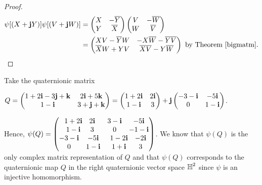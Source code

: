 \begin{proof}
		\begin{align*}
		\psi[(X+\textbf{j} Y)]\psi[(V+\textbf{j} W)] &= 
		\begin{pmatrix}
		X & -\overline{Y} \\ 
		Y & \overline{X} 
		\end{pmatrix}
		\begin{pmatrix}
		V & -\overline{W} \\ 
		W & \overline{V} 
		\end{pmatrix} \\
		&=
		\begin{pmatrix} 
		XV-\overline{Y}W & -X\overline{W}-\overline{Y}\overline{V} \\ 
		\overline{X}W+YV & \overline{X}\overline{V}-Y\overline{W} 
		\end{pmatrix} \text{ by Theorem \ref{bigmatm}.}
	\end{align*}
\end{proof}


\begin{ex}
	Take the quaternionic matrix 

	$Q = 
	\begin{pmatrix}
		1+2\textbf{i}-3\textbf{j}+\textbf{k} & 2\textbf{i}+5\textbf{k} \\
		1-\textbf{i} & 3+\textbf{j}+\textbf{k}
	\end{pmatrix}  = 
	\begin{pmatrix}
		1+2\textbf{i} & 2\textbf{i} \\
		1-\textbf{i} & 3
	\end{pmatrix}+\textbf{j}
	\begin{pmatrix}
		-3-\textbf{i} & -5\textbf{i} \\
		0 & 1-\textbf{i}
	\end{pmatrix}$.

	Hence, $\psi(Q) = 
	\begin{pmatrix}
		\begin{matrix}
			1+2\textbf{i} & 2\textbf{i} \\
			1-\textbf{i} & 3
		\end{matrix} &
		\begin{matrix}
			3-\textbf{i} & -5\textbf{i} \\
			0 & -1-\textbf{i}
		\end{matrix} \\
		\begin{matrix}
			-3-\textbf{i} & -5\textbf{i} \\
			0 & 1-\textbf{i}
		\end{matrix} &
		\begin{matrix}
			1-2\textbf{i} & -2\textbf{i} \\
			1+\textbf{i} & 3
		\end{matrix} 
	\end{pmatrix}$.
We know that $\psi(Q)$ is the only complex matrix representation of $Q$ and that $\psi(Q)$ corresponds to the quaternionic map $Q$ in the right quaternionic vector space $\operatorname{\mathbb{H}}^2$ since $\psi$ is an injective homomorphism.
\end{ex}
\newpage
